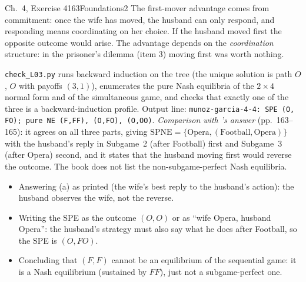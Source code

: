 \begin{exsol}{\MG{} Ch.~4, Exercise 4}{163}{Foundations}{2}
\interp The first-mover advantage comes from commitment: once the wife has moved, the husband
can only respond, and responding means coordinating on her choice. If the husband moved first the
opposite outcome would arise. The advantage depends on the \emph{coordination} structure: in the
prisoner's dilemma (item 3) moving first was worth nothing.

\verify \texttt{check\_L03.py} runs backward induction on the tree (the unique solution is path
$O$, $O$ with payoffs $(3,1)$), enumerates the pure Nash equilibria of the $2\times4$ normal form
and of the simultaneous game, and checks that exactly one of the three is a backward-induction profile.
Output line: \texttt{munoz-garcia-4-4: SPE (O, FO); pure NE (F,FF), (O,FO), (O,OO)}.
\emph{Comparison with \MG{}'s answer} (pp.~163--165): it agrees on all three parts, giving
$\mathrm{SPNE} = \{\text{Opera}, (\text{Football}, \text{Opera})\}$ with the husband's reply in
Subgame~2 (after Football) first and Subgame~3 (after Opera) second, and it states that the
husband moving first would reverse the outcome. The book does not list the non-subgame-perfect Nash equilibria.

\mistakes
\begin{itemize}
  \item Answering (a) as printed (the wife's best reply to the husband's action): the husband observes the wife,
  not the reverse.
  \item Writing the SPE as the outcome $(O,O)$ or as ``wife Opera, husband Opera'': the husband's strategy
  must also say what he does after Football, so the SPE is $(O, FO)$.
  \item Concluding that $(F,F)$ cannot be an equilibrium of the sequential game: it is a Nash equilibrium
  (sustained by $FF$), just not a subgame-perfect one.
\end{itemize}

\end{exsol}
